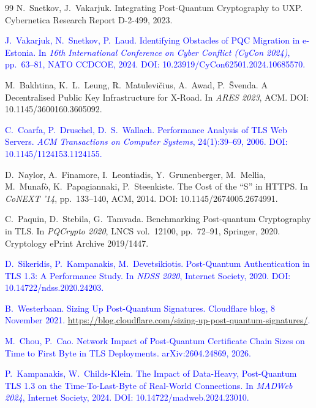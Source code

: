 \documentclass[conference,a4paper]{IEEEtran}
\newcommand{\newtext}[1]{{\color{blue}#1}}
\begin{document}
\begin{thebibliography}{99}
N.~Snetkov, J.~Vakarjuk.
\newblock Integrating Post-Quantum Cryptography to UXP.
\newblock Cybernetica Research Report D-2-499, 2023.

\textcolor{blue}{J.~Vakarjuk, N.~Snetkov, P.~Laud.
\newblock Identifying Obstacles of PQC Migration in e-Estonia.
\newblock In \emph{16th International Conference on Cyber Conflict (CyCon 2024)}, pp.~63--81,
NATO CCDCOE, 2024.
\newblock DOI: 10.23919/CyCon62501.2024.10685570.}

M.~Bakhtina, K.~L.~Leung, R.~Matulevi\v{c}ius, A.~Awad, P.~\v{S}venda.
\newblock A Decentralised Public Key Infrastructure for X-Road.
\newblock In \emph{ARES 2023}, ACM.
\newblock DOI: 10.1145/3600160.3605092.

\textcolor{blue}{C.~Coarfa, P.~Druschel, D.~S.~Wallach.
\newblock Performance Analysis of TLS Web Servers.
\newblock \emph{ACM Transactions on Computer Systems}, 24(1):39--69, 2006.
\newblock DOI: 10.1145/1124153.1124155.}

D.~Naylor, A.~Finamore, I.~Leontiadis, Y.~Grunenberger, M.~Mellia, M.~Munaf\`{o},
K.~Papagiannaki, P.~Steenkiste.
\newblock The Cost of the ``S'' in HTTPS.
\newblock In \emph{CoNEXT '14}, pp.~133--140, ACM, 2014.
\newblock DOI: 10.1145/2674005.2674991.

C.~Paquin, D.~Stebila, G.~Tamvada.
\newblock Benchmarking Post-quantum Cryptography in TLS.
\newblock In \emph{PQCrypto 2020}, LNCS vol.~12100, pp.~72--91, Springer, 2020.
\newblock Cryptology ePrint Archive 2019/1447.

\textcolor{blue}{D.~Sikeridis, P.~Kampanakis, M.~Devetsikiotis.
\newblock Post-Quantum Authentication in TLS 1.3: A Performance Study.
\newblock In \emph{NDSS 2020}, Internet Society, 2020.
\newblock DOI: 10.14722/ndss.2020.24203.}

\textcolor{blue}{B.~Westerbaan.
\newblock Sizing Up Post-Quantum Signatures.
\newblock Cloudflare blog, 8 November 2021.
\newblock \url{https://blog.cloudflare.com/sizing-up-post-quantum-signatures/}.}
\newblock \newtext{Accessed 19 November 2026.}

\textcolor{blue}{M.~Chou, P.~Cao.
\newblock Network Impact of Post-Quantum Certificate Chain Sizes on Time to First Byte in TLS
Deployments.
\newblock arXiv:2604.24869, 2026.}

\textcolor{blue}{P.~Kampanakis, W.~Childs-Klein.
\newblock The Impact of Data-Heavy, Post-Quantum TLS 1.3 on the Time-To-Last-Byte of Real-World
Connections.
\newblock In \emph{MADWeb 2024}, Internet Society, 2024.
\newblock DOI: 10.14722/madweb.2024.23010.}


\end{thebibliography}
\end{document}

